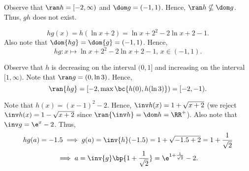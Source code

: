 \begin{solution}
\begin{ppart}
\begin{center}
        \end{center}
    \end{ppart}
    \begin{ppart}
        Observe that $\ran h = [-2, \infty)$ and $\dom g = (-1, 1)$. Hence, $\ran h \nsubseteq \dom g$. Thus, $gh$ does not exist.
    \end{ppart}
    \begin{ppart}
        \[hg(x) = h(\ln{x+2}) = \ln{x+2}^2 - 2\ln{x+2} - 1.\] Also note that $\dom{hg} = \dom{g} = (-1, 1)$. Hence, \[hg \colon x \mapsto \ln{x+2}^2 - 2\ln{x+2} - 1, \, x \in (-1, 1).\]

        Observe that $h$ is decreasing on the interval $(0, 1]$ and increasing on the interval $[1, \infty)$. Note that $\ran g = (0, \ln 3)$. Hence, \[\ran{hg} = [-2, \max \bc{h(0), h(\ln 3)}) = [-2, -1).\]
    \end{ppart}
    \begin{ppart}
        Note that $h(x) = (x-1)^2 -2$. Hence, $\inv h(x) = 1 + \sqrt{x+2}$ (we reject $\inv h(x) = 1 - \sqrt{x+2}$ since $\ran{\inv h} = \dom h = \RR^+$). Also note that $\inv g = \e^x - 2$. Thus,
        \begin{gather*}
            hg(a) = -1.5 \implies g(a) = \inv{h}(-1.5) = 1 + \sqrt{-1.5 + 2} = 1 + \frac1{\sqrt{2}}\\
            \implies a = \inv{g}\bp{1 + \frac1{\sqrt{2}}} = \e^{1 + \frac1{\sqrt{2}}} - 2.
        \end{gather*}
    \end{ppart}
\end{solution}

